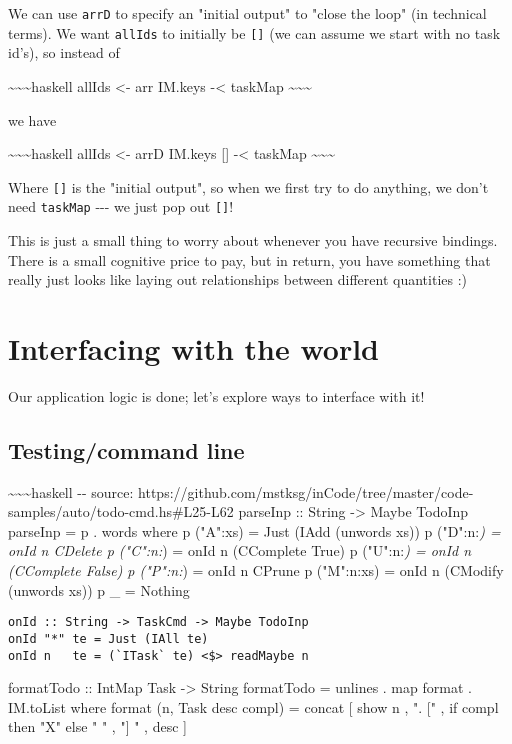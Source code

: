 \documentclass[]{article}
\begin{document}
We can use \texttt{arrD} to specify an "initial output" to "close the loop" (in
technical terms). We want \texttt{allIds} to initially be \texttt{{[}{]}} (we
can assume we start with no task id's), so instead of

\textasciitilde{}\textasciitilde{}\textasciitilde{}haskell allIds \textless{}-
arr IM.keys -\textless{} taskMap
\textasciitilde{}\textasciitilde{}\textasciitilde{}

we have

\textasciitilde{}\textasciitilde{}\textasciitilde{}haskell allIds \textless{}-
arrD IM.keys {[}{]} -\textless{} taskMap
\textasciitilde{}\textasciitilde{}\textasciitilde{}

Where \texttt{{[}{]}} is the "initial output", so when we first try to do
anything, we don't need \texttt{taskMap} -\/-\/- we just pop out
\texttt{{[}{]}}!

This is just a small thing to worry about whenever you have recursive bindings.
There is a small cognitive price to pay, but in return, you have something that
really just looks like laying out relationships between different quantities :)

\section{Interfacing with the world}

Our application logic is done; let's explore ways to interface with it!

\subsection{Testing/command line}

\textasciitilde{}\textasciitilde{}\textasciitilde{}haskell -\/- source:
https://github.com/mstksg/inCode/tree/master/code-samples/auto/todo-cmd.hs\#L25-L62
parseInp :: String -\textgreater{} Maybe TodoInp parseInp = p . words where p
("A":xs) = Just (IAdd (unwords xs)) p ("D":n:\emph{) = onId n CDelete p
("C":n:}) = onId n (CComplete True) p ("U":n:\emph{) = onId n (CComplete False)
p ("P":n:}) = onId n CPrune p ("M":n:xs) = onId n (CModify (unwords xs)) p \_ =
Nothing

\begin{verbatim}
onId :: String -> TaskCmd -> Maybe TodoInp
onId "*" te = Just (IAll te)
onId n   te = (`ITask` te) <$> readMaybe n
\end{verbatim}

formatTodo :: IntMap Task -\textgreater{} String formatTodo = unlines . map
format . IM.toList where format (n, Task desc compl) = concat {[} show n , ".
{[}" , if compl then "X" else " " , "{]} " , desc {]}
\end{document}
